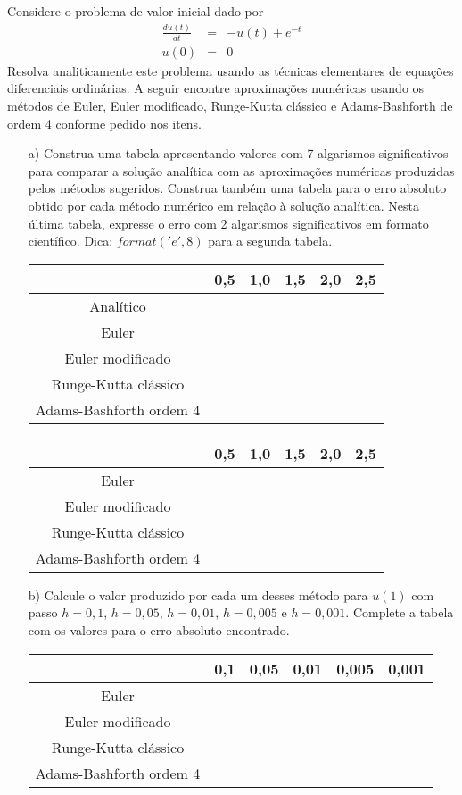 \begin{exer} Considere o problema de valor inicial dado por
\begin{eqnarray*}
\frac{d u(t)}{dt} &=& -u(t) + e^{-t} \\
u(0)&=&0
\end{eqnarray*}
Resolva analiticamente este problema usando as técnicas elementares de equações diferenciais ordinárias. A seguir encontre aproximações numéricas usando os métodos de Euler, Euler modificado, Runge-Kutta clássico e Adams-Bashforth de ordem 4 conforme pedido nos itens.
\begin{itemize}
\item[a)]  Construa uma tabela apresentando valores com 7 algarismos significativos para comparar a solução analítica com as aproximações numéricas produzidas pelos métodos sugeridos. Construa também uma tabela para o erro absoluto obtido por cada método numérico em relação à solução analítica. Nesta última tabela, expresse o erro com 2 algarismos significativos em formato científico. Dica: $format('e',8)$ para a segunda tabela.
\begin{center}
\begin{tabular}{|c|c|c|c|c|c|}
\hline
&0,5&1,0&1,5&2,0&2,5\\
\hline
Analítico&&&&&\\
\hline
Euler&&&&&\\
\hline
Euler modificado&&&&&\\
\hline
Runge-Kutta clássico&&&&&\\
\hline
Adams-Bashforth ordem 4&&&&&\\
\hline
\end{tabular}
\end{center}

\begin{center}
\begin{tabular}{|c|c|c|c|c|c|}
\hline
&0,5&1,0&1,5&2,0&2,5\\
\hline
Euler&&&&&\\
\hline
Euler modificado&&&&&\\
\hline
Runge-Kutta clássico&&&&&\\
\hline
Adams-Bashforth ordem 4&&&&&\\
\hline
\end{tabular}
\end{center}

\item[b)] Calcule o valor produzido por cada um desses método para $u(1)$ com passo $h=0,1$, $h=0,05$, $h=0,01$, $h=0,005$ e $h=0,001$. Complete a tabela com os valores para o erro absoluto encontrado.
\begin{center}
\begin{tabular}{|c|c|c|c|c|c|}
\hline
&0,1&0,05&0,01&0,005&0,001\\
\hline
Euler&&&&&\\
\hline
Euler modificado&&&&&   \\
\hline
Runge-Kutta clássico&&&&&\\
\hline
Adams-Bashforth ordem 4&&&&&\\
\hline
\end{tabular}
\end{center}


\end{itemize}
\end{exer}
